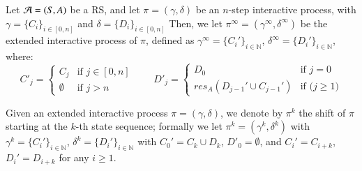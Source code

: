 \begin{definition}
Let ${\cal A}=(S,A)$ be a RS, and let $\pi =(\gamma,\delta)$  be an  $n$-step interactive process,
with $ \gamma=\{C_i\}_{i\in[0,n]}$ and  $\delta=\{D_i\}_{i\in[0,n]}$
Then, we let $\pi^\infty= (\gamma^\infty,\delta^\infty)$ be the extended interactive process of  $\pi$,
defined as $  \gamma^\infty=\{C_i'\}_{i\in\mathbb{N}}$, $\delta^\infty=\{D_i'\}_{i\in\mathbb{N}}$, where:
$$
C'_j = \left\{
\begin{array}{ll}
C_j & \mbox{if $j\in[0,n]$}\\
\emptyset & \mbox{if $j>n$}
\end{array}
\right.
\qquad
D'_j = \left\{
\begin{array}{ll}
D_0 & \mbox{if $j=0$}\\
\mathit{res}_A(D_{j-1}' \cup C_{j-1}') & \mbox{if ($j\geq 1$)}
\end{array}
\right.
$$
\end{definition}

Given an extended interactive process $\pi =(\gamma,\delta)$, we denote by $\pi^k$ the shift of $\pi$ starting at the $k$-th state sequence; formally we let $\pi^k=(\gamma^k,\delta^k)$ with
$\gamma^k=\{C_i'\}_{i\in\mathbb{N}}$, $\delta^k=\{D_i'\}_{i\in\mathbb{N}}$ with 
  $C_0'=C_k \cup D_k$, $D'_0 = \emptyset$, and   $C_i'=C_{i+k}$, $D_i'= D_{i+k}$ for any $i\geq 1$.





